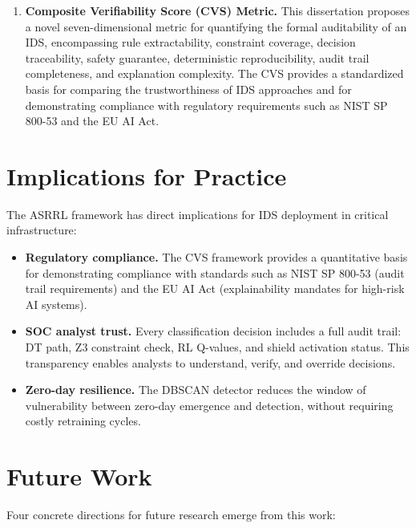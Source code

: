 \documentclass[12pt, letterpaper, oneside]{report}
\newcommand{\ASRRL}{\textsc{ASRRL}}
\begin{document}
\begin{enumerate}
    \item \textbf{Composite Verifiability Score (CVS) Metric.} This dissertation proposes a novel seven-dimensional metric for quantifying the formal auditability of an IDS, encompassing rule extractability, constraint coverage, decision traceability, safety guarantee, deterministic reproducibility, audit trail completeness, and explanation complexity. The CVS provides a standardized basis for comparing the trustworthiness of IDS approaches and for demonstrating compliance with regulatory requirements such as NIST SP 800-53 and the EU AI Act.
\end{enumerate}

\section{Implications for Practice}

The \ASRRL{} framework has direct implications for IDS deployment in critical infrastructure:

\begin{itemize}
    \item \textbf{Regulatory compliance.} The CVS framework provides a quantitative basis for demonstrating compliance with standards such as NIST SP 800-53 (audit trail requirements) and the EU AI Act (explainability mandates for high-risk AI systems).

    \item \textbf{SOC analyst trust.} Every classification decision includes a full audit trail: DT path, Z3 constraint check, RL Q-values, and shield activation status. This transparency enables analysts to understand, verify, and override decisions.

    \item \textbf{Zero-day resilience.} The DBSCAN detector reduces the window of vulnerability between zero-day emergence and detection, without requiring costly retraining cycles.
\end{itemize}

\section{Future Work}

Four concrete directions for future research emerge from this work:
\end{document}
